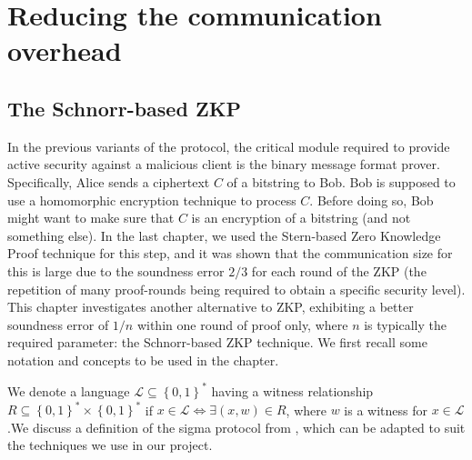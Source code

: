 \section{Reducing the communication overhead}
\label{sec:6challenge}

\subsection{The Schnorr-based ZKP}
\label{sec:zkpschnorr}
In the previous variants of the protocol, the critical module required to
provide active security against a malicious client is the binary message format
prover. Specifically, Alice sends a ciphertext \(C\) of a bitstring to Bob. Bob
is supposed to use a homomorphic encryption technique to process \(C\). Before
doing so, Bob might want to make sure that \(C\) is an encryption of a bitstring
(and not something else). In the last chapter, we used the Stern-based Zero Knowledge
Proof technique for this step, and it was shown that the communication size for
this is large due to the soundness error $2/3$ for each round of the ZKP (the
repetition of many proof-rounds being required to obtain a specific security
level). This chapter investigates another alternative to ZKP, exhibiting a better
soundness error of $1/n$ within one round of proof only, where $n$ is typically
the required parameter: the Schnorr-based ZKP technique. We first recall some
notation and concepts to be used in the chapter.

We denote a language $\mathcal{L} \subseteq \left\{ 0,1 \right\}^* $ having a
witness relationship
$R \subseteq \left\{ 0,1 \right\}^* \times \left\{ 0,1 \right\}^*$ if
$x \in \mathcal{L} \iff \exists (x,w) \in R$, where $w$ is a witness for
$x \in \mathcal{L}$.We discuss a definition of the sigma protocol from
\cite{benhamouda2014better}, which can be adapted to suit the techniques we use
in our project.

